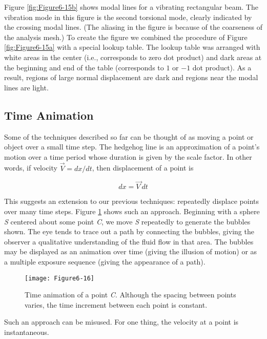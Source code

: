 Figure \ref{fig:Figure6-15b}  shows modal lines for a vibrating rectangular beam. The vibration mode in this figure is the second torsional mode, clearly indicated by the crossing modal lines. (The aliasing in the figure is because of the coarseness of the analysis mesh.) To create the figure we combined the procedure of Figure \ref{fig:Figure6-15a}  with a special lookup table. The lookup table was arranged with white areas in the center (i.e., corresponds to zero dot product) and dark areas at the beginning and end of the table (corresponds to $1$ or $-1$ dot product). As a result, regions of large normal displacement are dark and regions near the modal lines are light.

\subsection{Time Animation}
Some of the techniques described so far can be thought of as moving a point or object over a small time step. The hedgehog line is an approximation of a point's motion over a time period whose duration is given by the scale factor. In other words, if velocity $\vec{V} = dx/dt$, then displacement of a point is

\begin{equation}\label{eq:6.1}
dx = \overrightarrow{V\ }dt
\end{equation}

This suggests an extension to our previous techniques: repeatedly displace points over many time steps. Figure \ref{fig:Figure6-16} shows such an approach. Beginning with a sphere \emph{S} centered about some point \emph{C}, we move \emph{S} repeatedly to generate the bubbles shown. The eye tends to trace out a path by connecting the bubbles, giving the observer a qualitative understanding of the fluid flow in that area. The bubbles may be displayed as an animation over time (giving the illusion of motion) or as a multiple exposure sequence (giving the appearance of a path).

\begin{figure}[htb]
	\texttt{[image: Figure6-16]}
	\caption{Time animation of a point \emph{C}. Although the spacing between points varies, the time increment between each point is constant.}\label{fig:Figure6-16}
\end{figure}

Such an approach can be misused. For one thing, the velocity at a point is instantaneous.

